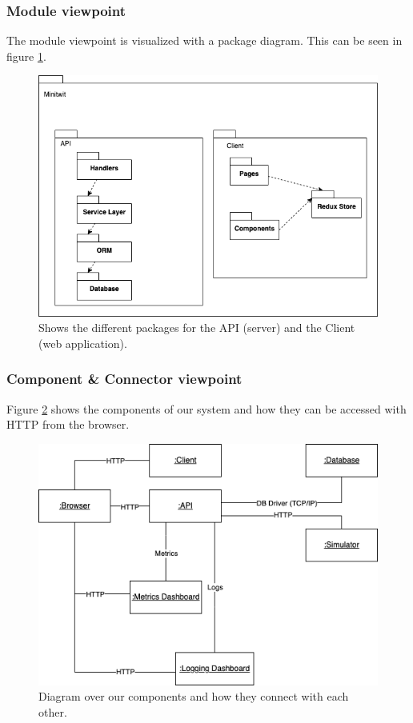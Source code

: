 \documentclass{article}
\begin{document}

\subsubsection{Module viewpoint}
The module viewpoint is visualized with a package diagram. This can be seen in figure \ref{fig:package-diagram}.

\begin{figure}[H]
   \centering
   \includegraphics[width=\textwidth]{minitwit-system-architecture-1-packages.drawio.png}
   \caption{Shows the different packages for the API (server) and the Client (web application).}
   \label{fig:package-diagram}
\end{figure}

\subsubsection{Component \& Connector viewpoint}
Figure \ref{fig:c-and-c-diagram} shows the components of our system and how they can be accessed with HTTP from the browser.

\begin{figure}[H]
   \centering
   \includegraphics[width=\textwidth]{minitwit-system-architecture-1-components and connectors.drawio.png}
   \caption{Diagram over our components and how they connect with each other.}
   \label{fig:c-and-c-diagram}
\end{figure}
\newpage
\end{document}
